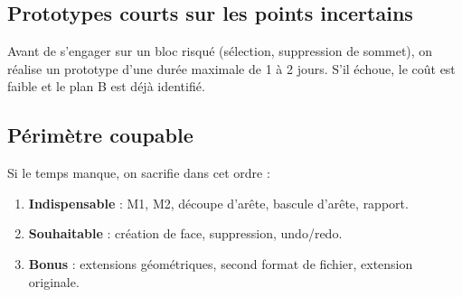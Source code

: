 \documentclass[11pt,a4paper]{article}
\begin{document}
\subsection*{Prototypes courts sur les points incertains}

Avant de s'engager sur un bloc risqué (sélection, suppression de sommet), on réalise un prototype d'une durée maximale de 1 à 2 jours. S'il échoue, le coût est faible et le plan B est déjà identifié.

\subsection*{Périmètre coupable}

Si le temps manque, on sacrifie dans cet ordre :
\begin{enumerate}[nosep]
  \item \textbf{Indispensable} : M1, M2, découpe d'arête, bascule d'arête, rapport.
  \item \textbf{Souhaitable} : création de face, suppression, undo/redo.
  \item \textbf{Bonus} : extensions géométriques, second format de fichier, extension originale.
\end{enumerate}
\end{document}
